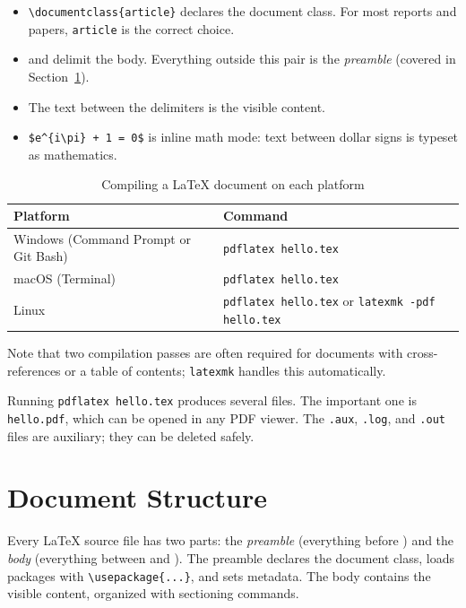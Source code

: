 \begin{itemize}
    \item \verb|\documentclass{article}| declares the document class.
          For most reports and papers, \texttt{article} is the correct
          choice.
    \item \verb|| and \verb|| delimit
          the body. Everything outside this pair is the
          \emph{preamble} (covered in
          Section~\ref{sec:latex-structure}).
    \item The text between the delimiters is the visible content.
    \item \verb|$e^{i\pi} + 1 = 0$| is inline math mode: text
          between dollar signs is typeset as mathematics.
\end{itemize}

\begin{table}[htbp]
\centering
\caption{Compiling a \LaTeX{} document on each platform}
\label{tab:latex-compile}
\footnotesize
\begin{tabular}{ll}
\toprule
\textbf{Platform} & \textbf{Command} \\
\midrule
Windows (Command Prompt or Git Bash) & \texttt{pdflatex hello.tex} \\
macOS (Terminal) & \texttt{pdflatex hello.tex} \\
Linux & \texttt{pdflatex hello.tex} or \texttt{latexmk -pdf hello.tex} \\
\bottomrule
\end{tabular}
\end{table}

Note that two compilation passes are often required for documents with
cross-references or a table of contents; \texttt{latexmk} handles
this automatically.

\vs
\noindent
Running \texttt{pdflatex hello.tex} produces several files. The
important one is \texttt{hello.pdf}, which can be opened in any PDF
viewer. The \texttt{.aux}, \texttt{.log}, and \texttt{.out} files are
auxiliary; they can be deleted safely.

\section{Document Structure}
\label{sec:latex-structure}

Every \LaTeX{} source file has two parts: the \emph{preamble}
(everything before \verb||) and the \emph{body}
(everything between \verb|| and
\verb||). The preamble declares the document class,
loads packages with \verb|\usepackage{...}|, and sets metadata. The
body contains the visible content, organized with sectioning commands.

